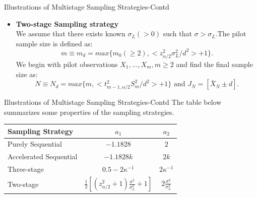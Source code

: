 \documentclass [xcolor=svgnames, t] {beamer}
\begin{document}
\begin{frame}{Illustrations of Multistage Sampling Strategies-Contd}
  \vspace{5mm}
    \begin{itemize}

\item \textbf{Two-stage Sampling strategy}
    \\ We assume that there exists known $\sigma_L(>0)$ such that $\sigma>\sigma_L$.The pilot sample size is defined as:
    $$m\equiv m_d=max \{ m_0(\ge 2),<z^2_{\alpha/2}\sigma_L^2/d^2>+1\}.$$
    We begin with pilot observations $X_1,\dots ,X_m, m \ge 2$ and find the final sample size as:
    \begin{equation*}
    N \equiv N_d=max\{ m,< t^2_{m-1,\alpha/2}S_m^2/d^2>+1\} \text{ and } J_N=[\bar{X}_N \pm d].
\end{equation*}

    \end{itemize}
\end{frame}


\begin{frame}{Illustrations of Multistage Sampling Strategies-Contd}
  \vspace{5mm}
    The table below summarizes some properties of the sampling strategies.
\begin{center}
\begin{tabular}{l c c} 
 \hline
 Sampling Strategy & $a_1$ & $a_2$ \\
 \hline
 Purely Sequential & $-1.1828$ & $2$  \\ 
Accelerated Sequential & $-1.1828k$ & $2k$  \\ 
Three-stage & $0.5-2\kappa^{-1}$ & $2\kappa^{-1}$  \\ 
 Two-stage & $\frac{1}{2}[(z^2_{\alpha/2}+1)\frac{\sigma^2}{\sigma^2_L}+1]$ & $2\frac{\sigma^2}{\sigma^2_L}$ \\
 \hline
\end{tabular}
\end{center}
\end{frame}
\end{document}
